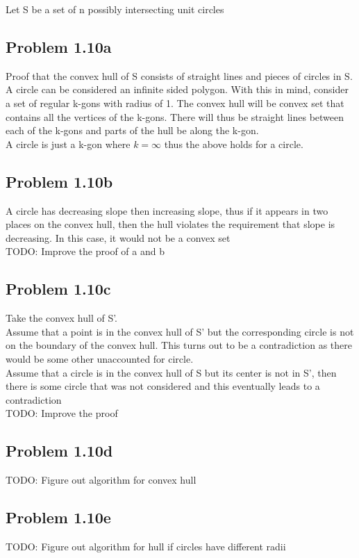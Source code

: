 \documentclass[11pt,psfig]{article}
\begin{document}
Let S be a set of n possibly intersecting unit circles

\subsection*{Problem 1.10a}

Proof that the convex hull of S consists of straight lines and pieces of circles in S. 
\\
A circle can be considered an infinite sided polygon. With this in mind, consider a set of regular k-gons with radius of 1. The convex hull will be convex set that contains all the vertices of the k-gons. There will thus be straight lines between each of the k-gons and parts of the hull be along the k-gon. 
\\
A circle is just a k-gon where $k=\infty$ thus the above holds for a circle. 

\subsection*{Problem 1.10b}


A circle has decreasing slope then increasing slope, thus if it appears in two places on the convex hull, then the hull violates the requirement that slope is decreasing. In this case, it would not be a convex set
\\
TODO: Improve the proof of a and b

\subsection*{Problem 1.10c}

Take the convex hull of S'. 
\\
Assume that a point is in the convex hull of S' but the corresponding circle is not on the boundary of the convex hull. This turns out to be a contradiction as there would be some other unaccounted for circle. \\
Assume that a circle is in the convex hull of S but its center is not in S', then there is some circle that was not considered and this eventually leads to a contradiction
\\
TODO: Improve the proof

\subsection*{Problem 1.10d}

TODO: Figure out algorithm for convex hull

\subsection*{Problem 1.10e}

TODO: Figure out algorithm for hull if circles have different radii




\end{document}
